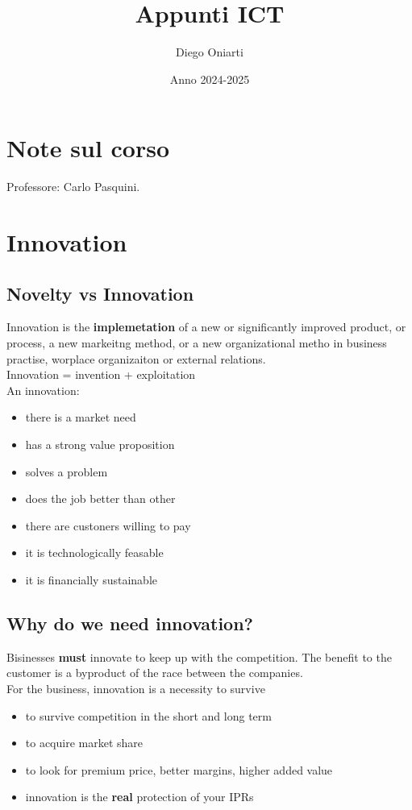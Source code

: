 \documentclass{article}
\title{Appunti ICT}
\author{Diego Oniarti}
\date{Anno 2024-2025}
\begin{document}
\maketitle
\tableofcontents

\section{Note sul corso}
Professore: Carlo Pasquini.

\section{Innovation}
\subsection{Novelty vs Innovation}
Innovation is the \textbf{implemetation} of a new or significantly improved product, or process, a new markeitng method, or a new organizational metho in business practise, worplace organizaiton or external relations. \\
Innovation = invention + exploitation \\
An innovation:
\begin{itemize}
    \item there is a market need
    \item has a strong value proposition
    \item solves a problem
    \item does the job better than other
    \item there are custoners willing to pay
    \item it is technologically feasable
    \item it is financially sustainable
\end{itemize}

\subsection{Why do we need innovation?}
Bisinesses \textbf{must} innovate to keep up with the competition. The benefit to the customer is a byproduct of the race between the companies. \\
For the business, innovation is a necessity to survive
\begin{itemize}
    \item to survive competition in the short and long term
    \item to acquire market share
    \item to look for premium price, better margins, higher added value
    \item innovation is the \textbf{real} protection of your IPRs
\end{itemize}
\end{document}
